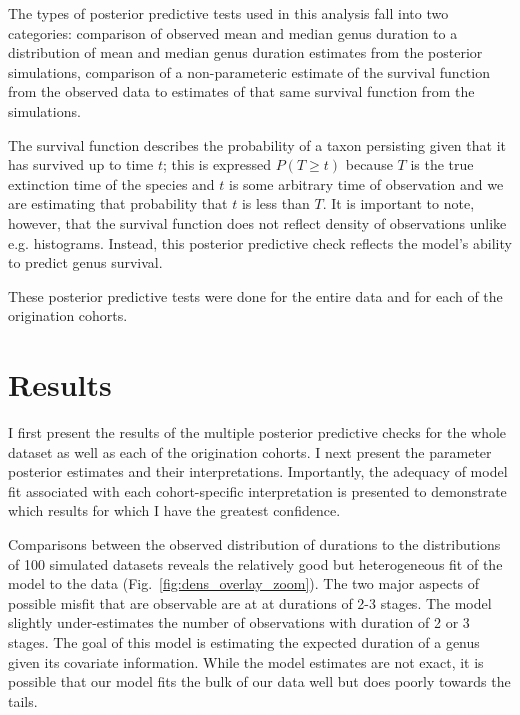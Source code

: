 \documentclass[11pt]{article}
\begin{document}
The types of posterior predictive tests used in this analysis fall into two categories: comparison of observed mean and median genus duration to a distribution of mean and median genus duration estimates from the posterior simulations, comparison of a non-parameteric estimate of the survival function from the observed data to estimates of that same survival function from the simulations. 

The survival function describes the probability of a taxon persisting given that it has survived up to time \(t\); this is expressed \(P(T \geq t)\) because \(T\) is the true extinction time of the species and \(t\) is some arbitrary time of observation and we are estimating that probability that \(t\) is less than \(T\). It is important to note, however, that the survival function does not reflect density of observations unlike e.g. histograms. Instead, this posterior predictive check reflects the model's ability to predict genus survival.

These posterior predictive tests were done for the entire data and for each of the origination cohorts.







\section*{Results}
I first present the results of the multiple posterior predictive checks for the whole dataset as well as each of the origination cohorts. I next present the parameter posterior estimates and their interpretations. Importantly, the adequacy of model fit associated with each cohort-specific interpretation is presented to demonstrate which results for which I have the greatest confidence.


Comparisons between the observed distribution of durations to the distributions of 100 simulated datasets reveals the relatively good but heterogeneous fit of the model to the data (Fig.~\ref{fig:dens_overlay_zoom}). The two major aspects of possible misfit that are observable are at at durations of 2-3 stages. The model slightly under-estimates the number of observations with duration of 2 or 3 stages. The goal of this model is estimating the expected duration of a genus given its covariate information. While the model estimates are not exact, it is possible that our model fits the bulk of our data well but does poorly towards the tails. 
\end{document}
